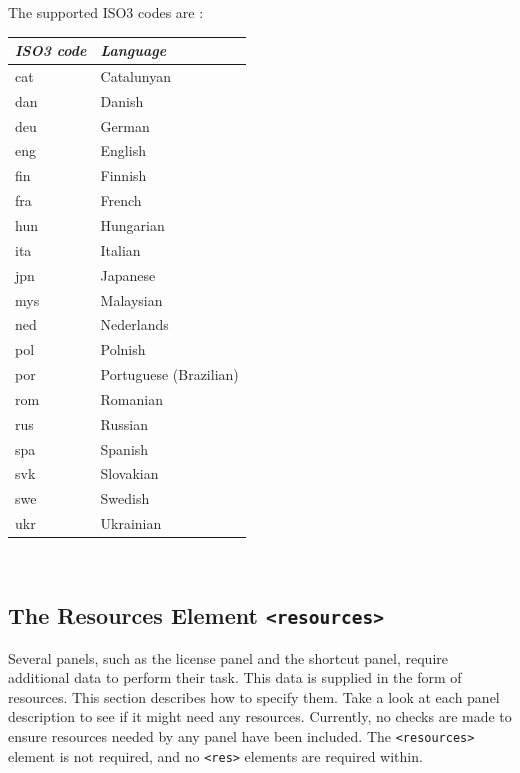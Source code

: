 The supported ISO3 codes are :
\begin{center}
\begin{tabular}{|l|l|}
\hline
\textit{ISO3 code} & \textit{Language} \\ \hline
cat & Catalunyan \\ \hline
dan & Danish \\ \hline
deu & German \\ \hline
eng & English \\ \hline
fin & Finnish \\ \hline
fra & French \\ \hline
hun & Hungarian \\ \hline
ita & Italian \\ \hline
jpn & Japanese \\ \hline
mys & Malaysian \\ \hline
ned & Nederlands \\ \hline
pol & Polnish \\ \hline
por & Portuguese (Brazilian) \\ \hline
rom & Romanian \\ \hline
rus & Russian \\ \hline
spa & Spanish \\ \hline
svk & Slovakian \\ \hline
swe & Swedish \\ \hline
ukr & Ukrainian \\ \hline
\end{tabular}\
\end{center}

\subsection{The Resources Element \texttt{<resources>}}
\label{resources-element}

Several panels, such as the license panel and the shortcut panel,
require additional data to perform their task. This data is supplied
in the form of resources. This section describes how to specify
them. Take a look at each panel description to see if it might need
any resources. Currently, no checks are made to ensure resources
needed by any panel have been included. The \texttt{<resources>}
element is not required, and no \texttt{<res>} elements are required
within.\\

